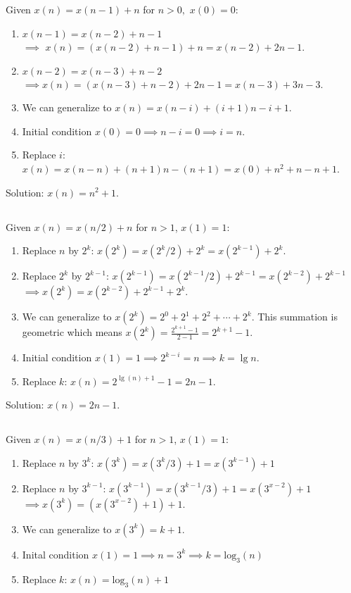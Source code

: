 \documentclass{article}
\newcommand{\logb}[2]{{\text{log}_{#1}(#2)}}
\begin{document}
\subsection{}
Given $x(n) = x(n-1) + n$ for $n>0,$ $x(0) = 0$:
\begin{enumerate}
    \item $x(n-1) = x(n-2) + n-1$\\
          $\implies$ $x(n) = (x(n-2) + n-1) + n = x(n-2) + 2n - 1$.
    \item $x(n-2) = x(n-3) + n - 2$\\
          $\implies x(n) = (x(n-3) + n - 2) + 2n - 1 = x(n-3) + 3n - 3$.
    \item We can generalize to $x(n) = x(n-i) + (i+1)n - i+1$.
    \item Initial condition $x(0) = 0 \implies n - i = 0 \implies i = n$.
    \item Replace $i$: $x(n) = x(n-n) + (n+1)n - (n+1) = x(0) + n^2 + n - n + 1$.
\end{enumerate}
Solution: $x(n) = n^2 + 1$.

\subsection{}
Given $x(n) = x(n/2) + n$ for $n > 1$, $x(1) = 1$:
\begin{enumerate}
      \item Replace $n$ by $2^k$: $x(2^k) = x(2^k/2) + 2^k = x(2^{k-1}) + 2^k$.
      \item Replace $2^k$ by $2^{k-1}$: $x(2^{k-1}) = x(2^{k-1}/2) + 2^{k-1} = x(2^{k-2}) + 2^{k-1}$\\
            $\implies x(2^k) = x(2^{k-2}) + 2^{k-1} + 2^k$.
      \item We can generalize to $x(2^k) = 2^0 + 2^1 + 2^2 + \cdots + 2^k$. This summation is geometric which means $x(2^k) = \frac{2^{k+1}-1}{2-1} = 2^{k+1}-1$.
      \item Initial condition $x(1) = 1 \implies 2^{k-i} = n \implies k = \lg n$. 
      \item Replace $k$: $x(n) = 2^{\lg(n)+1}-1 = 2n-1$.
\end{enumerate}
Solution: $x(n) = 2n - 1$.

\subsection{}
Given $x(n) = x(n/3) + 1$ for $n>1$, $x(1) = 1$:
\begin{enumerate}
    \item Replace $n$ by $3^k$: $x(3^k) = x(3^k/3) + 1 = x(3^{k-1}) + 1$\\
    \item Replace $n$ by $3^{k-1}$: $x(3^{k-1}) = x(3^{k-1}/3) + 1 = x(3^{x-2}) + 1$\\
          $\implies x(3^k) = (x(3^{x-2}) + 1) + 1$.
    \item We can generalize to $x(3^k) = k + 1$.
    \item Inital condition $x(1) = 1 \implies n = 3^k \implies k = \logb{3}{n}$
    \item Replace $k$: $x(n) = \logb{3}{n} + 1$
\end{enumerate}
\end{document}
